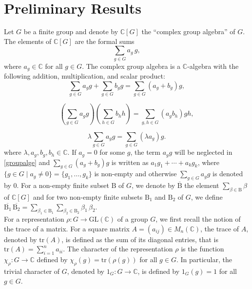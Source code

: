 \documentclass[12pt]{article}
\newcommand{\Beta}{\mathrm{B}}
\begin{document}
 \section{\bf Preliminary Results}
\quad Let $G$ be a finite group and denote by $\mathbb{C}[G]$ the ``complex group algebra'' of $G$.
 The elements of $\mathbb{C}[G]$ are the formal sums
 \begin{equation}\label{groupalge}
   \sum_{g \in G} a_g\, g,	
 \end{equation}
 where $a_g \in \mathbb{C}$ for all $g \in G$. The complex group algebra is a $\mathbb{C}$-algebra with the following addition,
 multiplication, and scalar product:
 \[
 \sum_{g \in G} a_g g + \sum_{g \in G} b_g g
 = \sum_{g \in G} (a_g + b_g) g,
 \]

 \[
 \left( \sum_{g \in G} a_g g \right)
 \left( \sum_{h \in G} b_h h \right)
 = \sum_{g , h \in G}
 \left( a_{g} b_{h} \right) g h,
 \]

 \[
 \lambda \sum_{g \in G} a_g g
 = \sum_{g \in G} (\lambda a_g) g.
 \]
 where $\lambda, a_g, b_g, b_h\in \mathbb{C}$.
 If $a_g = 0$ for some $g$, the term $a_g g$ will be neglected in \eqref{groupalge} and $ \sum_{g \in G} (a_g + b_g) g$  is written as
 $a_1 g_1 + \cdots + a_k g_k$,
 where $\{ g \in G \mid a_g \neq 0 \} = \{ g_1, \dots, g_k \}$
 is non-empty and otherwise $\sum_{g \in G} a_g g$ is denoted by $0$. For a non-empty finite subset $\Beta$ of $G$, we denote by
 $\overline{\Beta}$ the element $ \sum_{\beta \in \Beta} \beta$ of $\mathbb{C}[G]$ and for two non-empty finite subsets $\Beta_1$ and $\Beta_2$ of $G$, we define $\displaystyle \overline{\Beta_1} \, \overline{\Beta_2} =
 \sum_{\beta_1 \in \Beta_1} \sum_{\beta_2 \in \Beta_2} \beta_1 \, \beta_2$. \\
 For a representation $\rho: G \to \mathrm{GL}(\mathbb{C})$ of a group $G$, we first recall the notion of the trace of a matrix. For a square matrix $A=(a_{ij}) \in M_n(\mathbb{C})$, the trace of $A$, denoted by $\mathrm{tr}(A)$, is defined as the sum of its diagonal entries, that is $\mathrm{tr}(A)=\sum_{i=1}^{n} a_{ii}$. The character of the representation $\rho$ is the function $\chi_\rho: G \to \mathbb{C}$ defined by $\chi_\rho(g)=\mathrm{tr}(\rho(g))$ for all $g \in G$. In particular, the trivial character of $G$, denoted by $1_G: G \to \mathbb{C}$, is defined by $1_G(g)=1$ for all $g \in G$.
\end{document}
